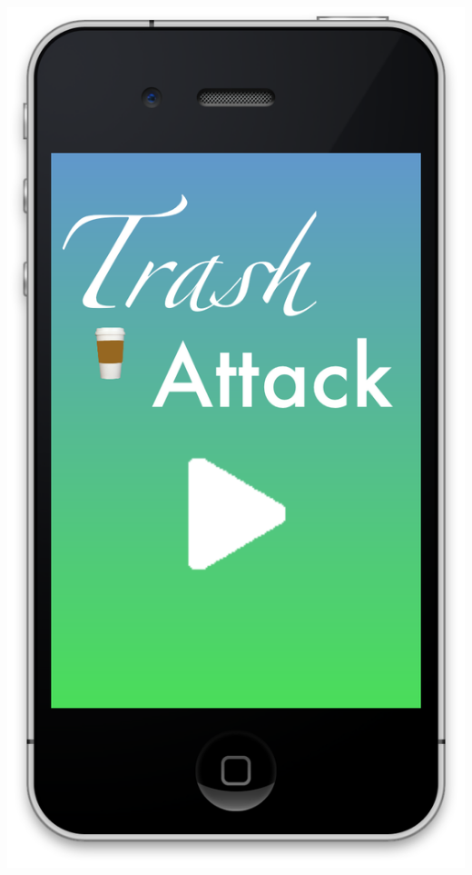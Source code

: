 \documentclass[11pt]{article}
\begin{document}
\includegraphics[scale=0.3]{loadingscreen}
\end{document}
